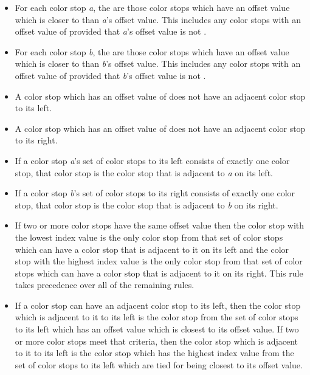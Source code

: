 \begin{itemize}
\item For each color stop \textit{a}, the  are those color stops which have an offset value which is closer to  than \textit{a}'s offset value.
\enternote
This includes any color stops with an offset value of  provided that \textit{a}'s offset value is not .
\exitnote

\item For each color stop \textit{b}, the  are those color stops which have an offset value which is closer to  than \textit{b}'s offset value.
\enternote
This includes any color stops with an offset value of  provided that \textit{b}'s offset value is not .
\exitnote

\item A color stop which has an offset value of  does not have an adjacent color stop to its left.

\item A color stop which has an offset value of  does not have an adjacent color stop to its right.

\item If a color stop \textit{a}'s set of color stops to its left consists of exactly one color stop, that color stop is the color stop that is adjacent to \textit{a} on its left.

\item If a color stop \textit{b}'s set of color stops to its right consists of exactly one color stop, that color stop is the color stop that is adjacent to \textit{b} on its right.

\item If two or more color stops have the same offset value then the color stop with the lowest index value is the only color stop from that set of color stops which can have a color stop that is adjacent to it on its left and the color stop with the highest index value is the only color stop from that set of color stops which can have a color stop that is adjacent to it on its right. This rule takes precedence over all of the remaining rules.

\item If a color stop can have an adjacent color stop to its left, then the color stop which is adjacent to it to its left is the color stop from the set of color stops to its left which has an offset value which is closest to its offset value. If two or more color stops meet that criteria, then the color stop which is adjacent to it to its left is the color stop which has the highest index value from the set of color stops to its left which are tied for being closest to its offset value.


\end{itemize}
